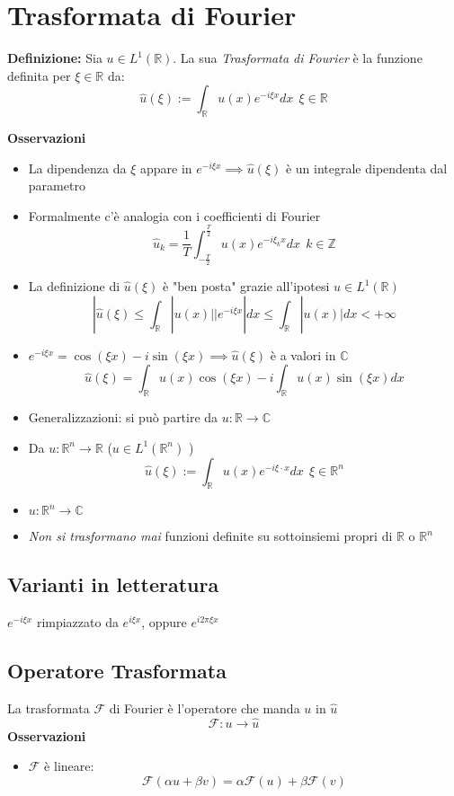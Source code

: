 \documentclass[a4paper]{article}
\newcommand{\R}{\mathbb{R}}
\newcommand{\C}{\mathbb{C}}
\newcommand{\Z}{\mathbb{Z}}
\begin{document}
\section{Trasformata di Fourier}
\begin{tcolorbox}
	\textbf{Definizione: }Sia $u\in L^{1}(\R)$. La sua \emph{Trasformata di Fourier} è la funzione definita per $\xi \in \R$ da:
	\[\hat{u}(\xi):=\int_{\R}^{} u(x)e^{-i\xi x}dx\ \ \xi \in \R\]

\end{tcolorbox}
\textbf{Osservazioni} 
\begin{itemize}
	\item La dipendenza da $\xi$ appare in $e^{-i\xi x}\implies \hat{u}(\xi)$ è un integrale dipendenta dal parametro
	\item Formalmente c'è analogia con i coefficienti di Fourier
		\[\hat{u}_k=\frac{1}{T}\int_{-\frac{T}{2}}^{\frac{T}{2}} u(x)e^{-i\xi_k x}dx\ \ k\in \Z\]
	\item La definizione di $\hat{u}(\xi)$ è "ben posta" grazie all'ipotesi $u\in L^{1}(\R)$ 
		\[|\hat{u}(\xi)\le \int_{\R}^{} |u(x) | |e^{-i\xi x}|dx\le \int_{\R}^{} |u(x)|dx<+\infty\]
	\item $e^{-i\xi x}=\cos(\xi x)-i\sin(\xi x)\implies \hat{u}(\xi)$ è a valori in $\C$ 
		\[\hat{u}(\xi)=\int_{\R}^{} u(x)\cos(\xi x)-i \int_{\R}^{} u(x) \sin(\xi x)dx\]  
	\item Generalizzazioni: si può partire da $u:\R\to \C$
	\item Da $u:\R^n\to \R$ ($u\in L^{1}(\R^n)$ )
		\[\hat{u}(\xi):=\int_{\R}^{} u(x)e^{-i\xi\cdot x}dx\ \ \xi \in \R^n\]
	\item $u:\R^n\to \C$ 
	\item \emph{Non si trasformano mai} funzioni definite su sottoinsiemi propri di $\R$ o $\R^n$
\end{itemize}
\subsection{Varianti in letteratura}
$e^{-i\xi x}$ rimpiazzato da $e^{i\xi x}$, oppure $e^{i 2\pi\xi x}$
\subsection{Operatore Trasformata}
La trasformata $\mathcal F$ di Fourier è l'operatore che manda $u$ in $\hat{ u}$ 
\[\mathcal F:u\to \hat{u}\]
\textbf{Osservazioni} 
\begin{itemize}
	\item $\mathcal F$ è lineare:
		\[\mathcal F(\alpha u+\beta v)=\alpha\mathcal F(u)+\beta\mathcal F(v)\]
\end{itemize}
\end{document}
